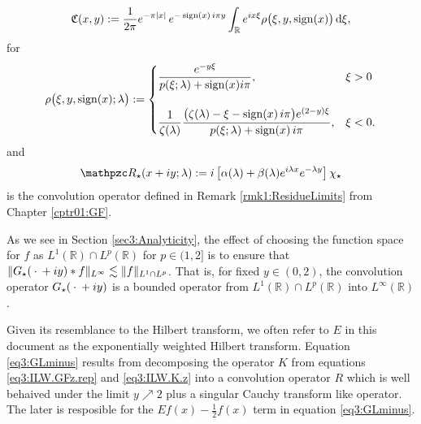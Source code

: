 \documentclass[../dissertation.tex]{subfiles}
\begin{document}
\begin{thm}
	\begin{align}\label{eq3:GFcont}
		\mathfrak C(x,y)
			:= \frac{1}{2\pi} e^{-\pi|x|} \, e^{- \operatorname{sign}(x) \, i \pi y }
				\int_{\mathbb R} e^{ix \xi} \rho\big(\xi, y, \operatorname{sign}(x)\big) \, \mathrm{d}\xi,
	\end{align}
	for
	\begin{align}\label{eq0:smallR}
		\rho\big(\xi, y, \operatorname{sign}(x); \lambda\big)
			:= 	
				\begin{cases}
					\dfrac{e^{-y\xi}}{p(\xi; \lambda) + \operatorname{sign}(x) i\pi}, & \xi > 0\\
					\\
					\dfrac{1}{\zeta(\lambda)} 
					\dfrac{\big(\zeta(\lambda)- \xi - \operatorname{sign}(x) \, i\pi \big)e^{(2-y)\xi} }
							{p(\xi; \lambda) + \operatorname{sign}(x) \, i\pi},
						&	\xi < 0.
				\end{cases}
	\end{align}
	and
	\begin{align}
		\mathpzc R_\star (x+iy; \lambda) 
			:= i 
				\left[
					\alpha(\lambda) 
					+ \beta(\lambda) e^{i\lambda x}e^{-\lambda y}
				\right] \chi_\star
	\end{align}
	is the convolution operator defined in Remark \ref{rmk1:ResidueLimits} from 
	Chapter \ref{cptr01:GF}.
\end{thm}

\begin{rmk}
	As we see in Section \ref{sec3:Analyticity}, the ef{}fect of choosing the 
	function space for $f$
	as $L^1(\mathbb R) \cap L^p(\mathbb R)$ for $p\in (1, 2]$ is to ensure that 
	$\|G_\star(\kern 0.5ex \cdot \kern 0.5ex + iy) *f \|_{L^\infty} \lesssim \|f\|_{L^1\cap L^p}$. That is, 
	for fixed $y \in (0, 2)$, the convolution operator $G_\star(\kern 0.5ex \cdot \kern 0.5ex+iy)$ is 
	a bounded operator from $L^1(\mathbb R) \cap L^p(\mathbb R)$ into 
	$L^\infty(\mathbb R)$.
\end{rmk}

Given its resemblance to the Hilbert transform, we often refer to $E$ in this 
document as the exponentially weighted Hilbert transform. Equation 
\eqref{eq3:GLminus} results from decomposing the operator $K$ from equations 
\eqref{eq3:ILW.GFz.rep} and \eqref{eq3:ILW.K.z} into a convolution operator 
$R$ which is well behaived under the limit $y\nearrow 2$ plus a singular Cauchy 
transform like operator. The later is resposible for the 
$Ef(x) - \frac{1}{2} f(x)$ term in equation \eqref{eq3:GLminus}.
\end{document}
